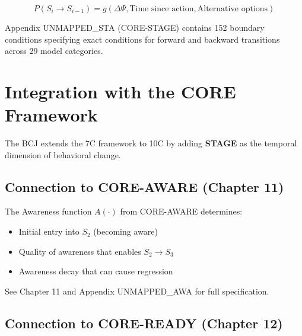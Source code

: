\begin{definition}
\begin{equation}
P(S_i \to S_{i-1}) = g(\Delta\Psi, \text{Time since action}, \text{Alternative options})
\label{eq:relapse-prob}
\end{equation}
\end{definition}

\begin{cross-reference}
Appendix UNMAPPED_STA (CORE-STAGE) contains 152 boundary conditions specifying
exact conditions for forward and backward transitions across 29 model categories.
\end{cross-reference}



\section{Integration with the CORE Framework}
\label{sec:bcj-integration}


The BCJ extends the 7C framework to 10C by adding \textbf{STAGE} as the
temporal dimension of behavioral change.

\subsection{Connection to CORE-AWARE (Chapter 11)}
\label{sec:bcj-awareness}

\begin{cross-reference}
The Awareness function $A(\cdot)$ from CORE-AWARE determines:
\begin{itemize}
    \item Initial entry into $S_2$ (becoming aware)
    \item Quality of awareness that enables $S_2 \to S_3$
    \item Awareness decay that can cause regression
\end{itemize}
See Chapter 11 and Appendix UNMAPPED_AWA for full specification.
\end{cross-reference}

\subsection{Connection to CORE-READY (Chapter 12)}
\label{sec:bcj-willingness}

